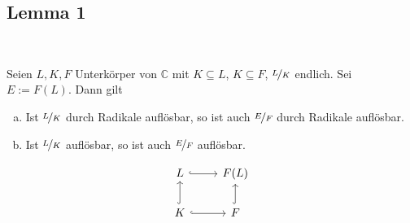 \subsection[Lemma 1: Auflösbarkeit in einem kommutierenden Diagramm]{Lemma 1} %
\label{sub:217}
\mbox{ } \\
\begin{minipage}{0.95\textwidth}
	Seien $L,K,F$ Unterkörper von $\mathds{C}$ mit $K \subseteq L$, $K \subseteq F$, $\nicefrac{L}{K}$ endlich. Sei $E := F(L)$. Dann gilt
	\begin{enumerate}[a)]
		\item Ist $\nicefrac{L}{K}$ durch Radikale auflösbar, so ist auch $\nicefrac{E}{F}$ durch Radikale auflösbar.
		\item Ist $\nicefrac{L}{K}$ auflösbar, so ist auch $\nicefrac{E}{F}$ auflösbar.
	\end{enumerate}
\end{minipage}
\begin{minipage}{0.1\textwidth}
	\[
		\begin{tikzcd}
			L \rar[hook]&  F(L)\\
			K \uar[hook] \rar[hook] & F \uar[hook]
		\end{tikzcd}
	\]
\end{minipage}
